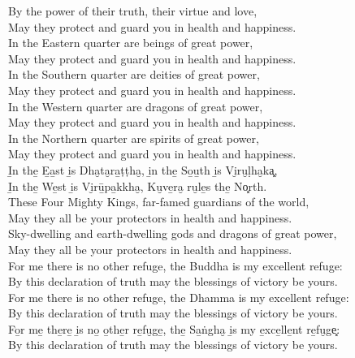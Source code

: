 \begin{onechants}
By the power of their truth, their virtue and love,\\
May they protect and guard you in health and happiness.\\
In the Eastern quarter are beings of great power,\\
May they protect and guard you in health and happiness.\\
In the Southern quarter are deities of great power,\\
May they protect and guard you in health and happiness.\\
In the Western quarter are dragons of great power,\\
May they protect and guard you in health and happiness.\\
In the Northern quarter are spirits of great power,\\
May they protect and guard you in health and happiness.\\
I̱n the̱ E̱a̱st i̱s Dha̮ta̮ra̱ṭṭha̮, i̱n the̱ So̱u̱th i̱s Vi̮ru̮ḷha̮ka͓,\\
I̱n the̱ We̱st i̱s Vi̮rū̱pa̱kkha̮, Ku̮ve̱ra̮ ru̮le̱s the̱ No͓rth.\\
These Four Mighty Kings, far-famed guardians of the world,\\
May they all be your protectors in health and happiness.\\
Sky-dwelling and earth-dwelling gods and dragons of great power,\\
May they all be your protectors in health and happiness.\\
For me there is no other refuge, the Buddha is my excellent refuge:\\
By this declaration of truth may the blessings of victory be yours.\\
For me there is no other refuge, the Dhamma is my excellent refuge:\\
By this declaration of truth may the blessings of victory be yours.\\
Fo̱r me̱ the̱re̱ i̱s no̱ o̱the̱r re̱fu̮ge̱, the̱ Sa̱ṅgha̮ i̱s my e̱xce̱lle̱nt re̱fu̮ge͓:\\
By this declaration of truth may the blessings of victory be yours.\\
\end{onechants}

\clearpage

\paliText
\enlargethispage{2\baselineskip}
\savenotes

